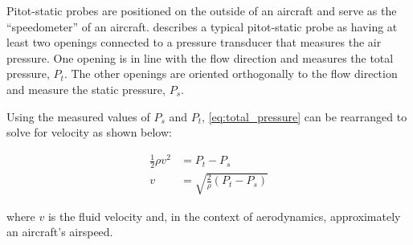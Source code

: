 Pitot-static probes are positioned on the outside of an aircraft and serve as the ``speedometer'' of an aircraft. \citet{Hall_2023} describes a typical pitot-static probe as having at least two openings connected to a pressure transducer that measures the air pressure. One opening is in line with the flow direction and measures the total pressure, $P_t$. The other openings are oriented orthogonally to the flow direction and measure the static pressure, $P_s$.

Using the measured values of $P_s$ and $P_t$, \autoref{eq:total_pressure} can be rearranged to solve for velocity as shown below:

\begin{align}
    \frac{1}{2} \rho v^2 &= P_t - P_s \nonumber \\
    v &= \sqrt{\frac{2}{\rho} \left(P_t - P_s\right)} \label{eq:velocity_from_bernoullis}
\end{align}

\noindent where $v$ is the fluid velocity and, in the context of aerodynamics, approximately an aircraft's airspeed.